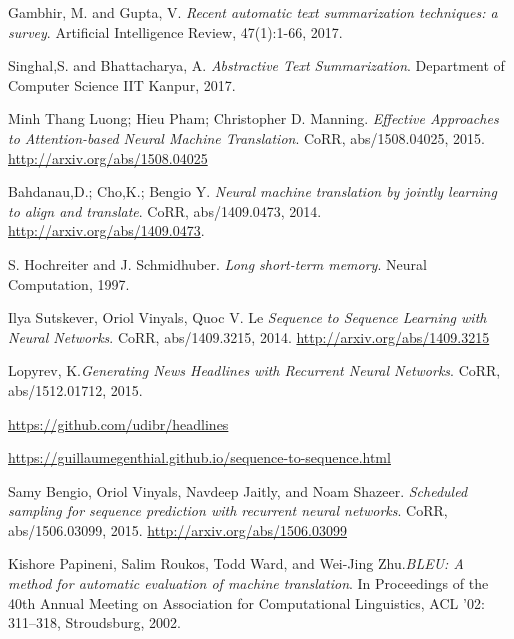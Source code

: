\begin{center}
\begin{table}[!htb]
\begin{tabular}{|l|l|l|}
\end{tabular}
\end{table}
\end{center}



\pagebreak

\begin{thebibliography}{9}
	
	Gambhir, M. and Gupta, V. \textit{Recent automatic text summarization techniques: a survey}. Artificial Intelligence Review, 47(1):1-66, 2017.
	
	Singhal,S. and Bhattacharya, A. \textit{Abstractive Text Summarization}. Department of Computer Science IIT Kanpur, 2017.
	
	Minh Thang Luong; Hieu Pham; Christopher D. Manning. \textit{Effective Approaches to Attention-based Neural Machine Translation}. CoRR, abs/1508.04025, 2015. \url{http://arxiv.org/abs/1508.04025}
	
	Bahdanau,D.; Cho,K.; Bengio Y. \textit{Neural machine translation by jointly learning to align and translate}. CoRR, abs/1409.0473, 2014. \url{ http://arxiv.org/abs/1409.0473}.
	
		
	S. Hochreiter and J. Schmidhuber. \textit{Long short-term memory}. Neural Computation, 1997.
	
	Ilya Sutskever, Oriol Vinyals, Quoc V. Le \textit{Sequence to Sequence Learning with Neural Networks}. CoRR, abs/1409.3215, 2014. \url{http://arxiv.org/abs/1409.3215}

		 
	Lopyrev, K.\textit{Generating News Headlines with Recurrent Neural 	Networks}. CoRR, abs/1512.01712, 2015.
	
	
	 \url{https://github.com/udibr/headlines}
	 
	 \url{https://guillaumegenthial.github.io/sequence-to-sequence.html}
	
	Samy Bengio, Oriol Vinyals, Navdeep Jaitly, and Noam Shazeer. \textit{Scheduled sampling for sequence
prediction with recurrent neural networks}. CoRR, abs/1506.03099, 2015. \url{http://arxiv.org/abs/1506.03099}

Kishore Papineni, Salim Roukos, Todd Ward, and Wei-Jing Zhu.\textit{BLEU: A method for automatic evaluation of machine translation}. In Proceedings of the 40th Annual Meeting on Association for Computational Linguistics, ACL ’02: 311–318, Stroudsburg, 2002. 
	
	

\end{thebibliography}


